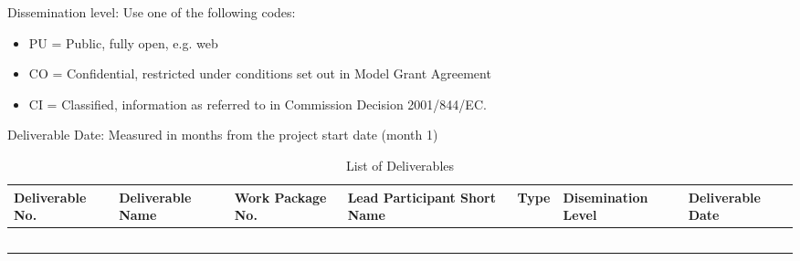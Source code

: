 Dissemination level: Use one of the following codes:
\begin{itemize}
\item PU = Public, fully open, e.g. web
\item CO = Confidential, restricted under conditions set out in Model Grant Agreement
\item CI = Classified, information as referred to in Commission Decision 2001/844/EC.
\end{itemize}

Deliverable Date: Measured in months from the project start date (month 1)

\begin{longtable}[H]{p{1.8cm} p{2cm} p{1.3cm} p{1.8cm} p{1.3cm} p{2.1cm} p{1.8cm}}
	\toprule[2pt]
	
	\textbf{Deliverable No.} & \textbf{Deliverable Name} & \textbf{Work Package No.} & \textbf{Lead Participant Short Name} & \textbf{Type} & \textbf{Disemination Level} & \textbf{Deliverable Date} \\
	
	\midrule[1.5pt] 
	\endhead
	
	&  &  &  &  &  & \vspace{0.2cm} \\
	
	\midrule

	 &  &  &  &  &  & \vspace{0.2cm} \\
	
	\midrule
	
	 &  &  &  &  &  &  \vspace{0.2cm} \\

	\midrule

 	 &  &  &  &  &  &  \vspace{0.2cm} \\
	
	\bottomrule[2pt]
	
	\caption{List of Deliverables}
	\label{workpackages}
\end{longtable}

